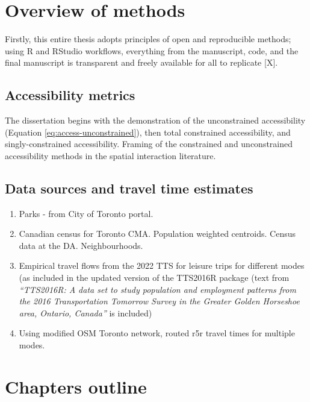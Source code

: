 \documentclass[
11pt, %
oneside, %
english, %
singlespacing, %
]{macthesis} %
\begin{document}
\section{Overview of methods}\label{overview-of-methods}

Firstly, this entire thesis adopts principles of open and reproducible methods; using R and RStudio workflows, everything from the manuscript, code, and the final manuscript is transparent and freely available for all to replicate {[}X{]}.

\subsection{Accessibility metrics}\label{accessibility-metrics}

The dissertation begins with the demonstration of the unconstrained accessibility (Equation \ref{eq:access-unconstrained}), then total constrained accessibility, and singly-constrained accessibility. Framing of the constrained and unconstrained accessibility methods in the spatial interaction literature.

\subsection{Data sources and travel time estimates}\label{data-sources-and-travel-time-estimates}

\begin{enumerate}
\def\labelenumi{\arabic{enumi})}
\item
  Parks - from City of Toronto portal.
\item
  Canadian census for Toronto CMA. Population weighted centroids. Census data at the DA. Neighbourhoods.
\item
  Empirical travel flows from the 2022 TTS for leisure trips for different modes (as included in the updated version of the TTS2016R package (text from \emph{``TTS2016R: A data set to study population and employment patterns from the 2016 Transportation Tomorrow Survey in the Greater Golden Horseshoe area, Ontario, Canada''} is included)
\item
  Using modified OSM Toronto network, routed r5r travel times for multiple modes.
\end{enumerate}

\section{Chapters outline}\label{chapters-outline}
\end{document}
